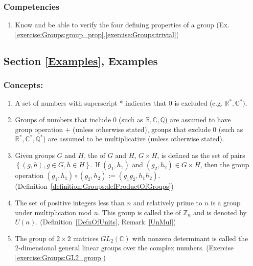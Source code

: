\subsubsection*{Competencies}
\begin{enumerate}
\item
Know and be able to verify the four defining properties of a group (Ex. \ref{exercise:Groups:group_prop},\ref{exercise:Groups:trivial})
\end{enumerate}


\subsection*{Section \ref{Examples}, Examples}
\subsubsection*{Concepts:}
\begin{enumerate}
\item
A set of numbers  with superscript * indicates that 0 is excluded  (e.g. $\mathbb{R}^{\ast},\mathbb{C}^{\ast})$.
\item
Groups of numbers that include 0 (such as ${\mathbb R}, {\mathbb C}, {\mathbb Q}$) are assumed to have group operation + (unless otherwise stated),  groups that exclude 0 (such as ${\mathbb R}^{\ast}, {\mathbb C}^{\ast}, {\mathbb Q}^{\ast}$) are assumed to be multiplicative (unless otherwise stated).
\item
Given groups $G$ and $H$, the  of $G$ and $H$, $G \times H$, is defined as the set of pairs $\left\{(g,h), g \in G, h \in H \right\}$.  If $(g_1, h_1)$ and $(g_2, h_2) \in G \times H$, then the group operation $(g_1, h_1) \circ (g_2, h_2) := (g_1g_2, h_1h_2)$. (Definition~\ref{definition:Groups:defProductOfGroups})
\item
The set of positive integers less than $n$ and relatively prime to $n$ is a group under multiplication mod $n$. This group is called the  of ${\mathbb Z}_n$  and is denoted by $U(n)$.  (Definition~\ref{DefnOfUnits}, Remark~\ref{UnMul})
\item
The group of $2 \times 2$ matrices $GL_2({\mathbb C})$ with nonzero determinant is called the 2-dimensional general linear groups over the complex numbers. (Exercise \ref{exercise:Groups:GL2_group})
\end{enumerate}

